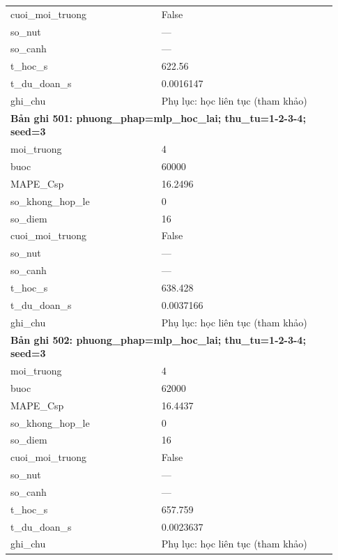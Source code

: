 \begin{longtable}{p{0.43\linewidth}p{0.50\linewidth}}
cuoi\_\allowbreak moi\_\allowbreak truong & False \\
so\_\allowbreak nut & — \\
so\_\allowbreak canh & — \\
t\_\allowbreak hoc\_\allowbreak s & 622.56 \\
t\_\allowbreak du\_\allowbreak doan\_\allowbreak s & 0.0016147 \\
ghi\_\allowbreak chu & Phụ lục: học liên tục (tham khảo) \\
\midrule
\multicolumn{2}{p{0.95\linewidth}}{\textbf{Bản ghi 501: phuong\_phap=mlp\_hoc\_lai; thu\_tu=1-2-3-4; seed=3}} \\
moi\_\allowbreak truong & 4 \\
buoc & 60000 \\
MAPE\_\allowbreak Csp & 16.2496 \\
so\_\allowbreak khong\_\allowbreak hop\_\allowbreak le & 0 \\
so\_\allowbreak diem & 16 \\
cuoi\_\allowbreak moi\_\allowbreak truong & False \\
so\_\allowbreak nut & — \\
so\_\allowbreak canh & — \\
t\_\allowbreak hoc\_\allowbreak s & 638.428 \\
t\_\allowbreak du\_\allowbreak doan\_\allowbreak s & 0.0037166 \\
ghi\_\allowbreak chu & Phụ lục: học liên tục (tham khảo) \\
\midrule
\multicolumn{2}{p{0.95\linewidth}}{\textbf{Bản ghi 502: phuong\_phap=mlp\_hoc\_lai; thu\_tu=1-2-3-4; seed=3}} \\
moi\_\allowbreak truong & 4 \\
buoc & 62000 \\
MAPE\_\allowbreak Csp & 16.4437 \\
so\_\allowbreak khong\_\allowbreak hop\_\allowbreak le & 0 \\
so\_\allowbreak diem & 16 \\
cuoi\_\allowbreak moi\_\allowbreak truong & False \\
so\_\allowbreak nut & — \\
so\_\allowbreak canh & — \\
t\_\allowbreak hoc\_\allowbreak s & 657.759 \\
t\_\allowbreak du\_\allowbreak doan\_\allowbreak s & 0.0023637 \\
ghi\_\allowbreak chu & Phụ lục: học liên tục (tham khảo) \\

\end{longtable}
